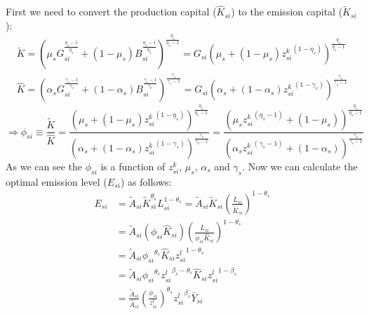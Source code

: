 First we need to convert the production capital ($\hat{K}_{si}$) to the emission capital ($\tilde{K}_{si}$):
\begin{equation*}
    \begin{split}
        \tilde{K} = (
        \mu_s G_{si}^{\frac{\eta_s-1}{\eta_s}} + (1-\mu_s) B_{si}^{\frac{\eta_s-1}{\eta_s}}
    ) ^ {\frac{\eta_s}{\eta_s-1}} = G_{si}(\mu_s  + (1-\mu_s){z^k_{si}}^{(1-\eta_s )})^ {\frac{\eta_s}{\eta_s-1}}\\
    \hat{K} = (
        \alpha_s G_{si}^{\frac{\gamma_s-1}{\gamma_s}} + (1-\alpha_s) B_{si}^{\frac{\gamma_s-1}{\gamma_s}}
    ) ^ {\frac{\gamma_s}{\gamma_s-1}} = G_{si}(\alpha_s  + (1-\alpha_s){z^k_{si}}^{(1-\gamma_s )})^ {\frac{\gamma_s}{\gamma_s-1}}
    \end{split}
\end{equation*}
\begin{equation*}
    \Rightarrow \phi_{si} \equiv \frac{\tilde{K}}{\hat{K}} = \frac{(\mu_s  + (1-\mu_s){z^k_{si}}^{(1-\eta_s )})^ {\frac{\eta_s}{\eta_s-1}}}{(\alpha_s  + (1-\alpha_s){z^k_{si}}^{(1-\gamma_s )}) ^{\frac{\gamma_s}{\gamma_s-1}}} = \frac{(\mu_s {z^k_{si}}^{(\eta_s -1)}  + (1-\mu_s))^ {\frac{\eta_s}{\eta_s-1}}}{(\alpha_s {z^k_{si}}^{(\gamma_s -1)}  + (1-\alpha_s))^{\frac{\gamma_s}{\gamma_s-1}}}
\end{equation*}
As we can see the $\phi_{si}$ is a function of $z^k_{si}$, $\mu_s$, $\alpha_s$ and $\gamma_s$. Now we can calculate the optimal emission level ($E_{si}$) as follows:
\begin{equation*}
    \begin{split}
        E_{si} &= \tilde{A}_{si}\tilde{K}_{si}^{\theta_s} L_{si}^{1-\theta_s} = \tilde{A}_{si} \tilde{K}_{si} ({\frac{L_{si}}{\tilde{K}_{si}}})^{1-\theta_s}\\
    &= \tilde{A}_{si} (\phi_{si} \hat{K}_{si}) ({\frac{L_{si}}{\phi_{si} \hat{K}_{si}}})^{1-\theta_s}\\
    &= {\tilde{A}_{si}}{\phi_{si}}^{\theta_s} \hat{K}_{si} {z^{l}_{si}}^{1-\theta_s} \\
   & = {\tilde{A}_{si}}{\phi_{si}}^{\theta_s}{z^{l}_{si}}^{\beta_s-\theta_s}\hat{K}_{si}{z^{l}_{si}}^{1-\beta_s}\\
   & = \frac{\tilde{A}_{si}}{\hat{A}_{si}}(\frac{\phi_{si}}{z^{l}_{si}})^{\theta_s} {z^{l}_{si}}^{\beta_s} \bar{Y}_{si}
    \end{split}
\end{equation*}
